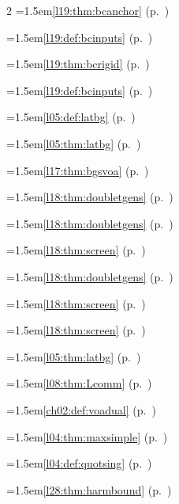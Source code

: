 \begin{multicols}{2}
\hangindent=1.5em\quad \ref{l19:thm:bcanchor} (p.~\pageref{l19:thm:bcanchor})\par
\hangindent=1.5em\quad \ref{l19:def:bcinputs} (p.~\pageref{l19:def:bcinputs})\par
\hangindent=1.5em\quad \ref{l19:thm:bcrigid} (p.~\pageref{l19:thm:bcrigid})\par
\hangindent=1.5em\quad \ref{l19:def:bcinputs} (p.~\pageref{l19:def:bcinputs})\par
\hangindent=1.5em\quad \ref{l05:def:latbg} (p.~\pageref{l05:def:latbg})\par
\hangindent=1.5em\quad \ref{l05:thm:latbg} (p.~\pageref{l05:thm:latbg})\par
\hangindent=1.5em\quad \ref{l17:thm:bgsvoa} (p.~\pageref{l17:thm:bgsvoa})\par
\hangindent=1.5em\quad \ref{l18:thm:doubletgens} (p.~\pageref{l18:thm:doubletgens})\par
\hangindent=1.5em\quad \ref{l18:thm:doubletgens} (p.~\pageref{l18:thm:doubletgens})\par
\hangindent=1.5em\quad \ref{l18:thm:screen} (p.~\pageref{l18:thm:screen})\par
\hangindent=1.5em\quad \ref{l18:thm:doubletgens} (p.~\pageref{l18:thm:doubletgens})\par
\hangindent=1.5em\quad \ref{l18:thm:screen} (p.~\pageref{l18:thm:screen})\par
\hangindent=1.5em\quad \ref{l18:thm:screen} (p.~\pageref{l18:thm:screen})\par
\hangindent=1.5em\quad \ref{l05:thm:latbg} (p.~\pageref{l05:thm:latbg})\par
\hangindent=1.5em\quad \ref{l08:thm:Lcomm} (p.~\pageref{l08:thm:Lcomm})\par
\hangindent=1.5em\quad \ref{ch02:def:voadual} (p.~\pageref{ch02:def:voadual})\par
\hangindent=1.5em\quad \ref{l04:thm:maxsimple} (p.~\pageref{l04:thm:maxsimple})\par
\hangindent=1.5em\quad \ref{l04:def:quotsing} (p.~\pageref{l04:def:quotsing})\par
\hangindent=1.5em\quad \ref{l28:thm:harmbound} (p.~\pageref{l28:thm:harmbound})\par

\end{multicols}
